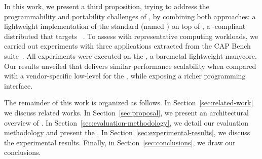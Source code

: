 	In this work, we present a third proposition, trying to address the programmability and
	portability challenges of \lws, by combining both approaches: a lightweight
	implementation of the \mpi standard (named \lwmpi) on top of \nanvix,
	a \posix-compliant distributed \os that targets \lws~\cite{Penna2019-3}.
	To assess \lwmpi with representative
	computing workloads, we carried out experiments with three applications extracted
	from the CAP Bench suite~\cite{Souza2017}. All experiments were executed on the
	\mppa, a baremetal lightweight manycore. Our results unveiled that \lwmpi delivers
	similar performance scalability when compared
	with a vendor-specific low-level \api for the \mppa, while exposing a richer
	programming interface.

	The remainder of this work is organized as follows.
	In Section~\ref{sec:related-work} we discuss related works. In
	Section~\ref{sec:proposal}, we present an architectural overview of \lwmpi.
	In Section~\ref{sec:evaluation-methodology}, we
	detail our evaluation methodology and present the \mppa. In
	Section~\ref{sec:experimental-results},
	we discuss the experimental results. Finally, in
	Section~\ref{sec:conclusions}, we draw our conclusions.
